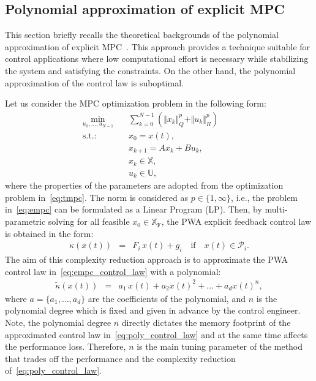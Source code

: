 \documentclass[letterpaper, 10 pt, conference]{ieeeconf}
\newcommand{\polydegree}{n}
\begin{document}
	\subsection{Polynomial approximation of explicit MPC}
	\label{sec:polynomial}
	This section briefly recalls the theoretical backgrounds of the polynomial approximation of explicit MPC~\cite{kvasnica_polynomial}. This approach provides a technique suitable for control applications where low computational effort is necessary while stabilizing the system and satisfying the constraints. On the other hand, the polynomial approximation of the control law is suboptimal. 
	
	Let us consider the MPC optimization problem in the following form:
	\begin{subequations}
		\label{eq:empc}
		\begin{eqnarray}
			\label{eq:empc_cost}
			\min_{u_{0},\ldots,u_{N-1}} \!\!\!\!\!\!\!\!\!\!\! &\,& \sum_{k=0}^{N-1} \left( \Vert x_{k} \Vert_{Q}^{p} + \Vert u_{k} \Vert_{R}^{p} \right) \qquad \\
			\label{eq:empc_rpi}
			\mathrm{s.t.\!:} &\,& x_0 = x(t), \\
			\label{eq:empc_model}
			&\,&  x_{k+1} = A x_{k} + B u_{k} , \\
			\label{eq:empc_constraints_state}
			&\,& x_{k} \in \mathbb{X} , \\
			\label{eq:empc_constraints_input}
			&\,& u_{k} \in \mathbb{U},
		\end{eqnarray}
	\end{subequations}
	where the properties of the parameters are adopted from the optimization problem in~\eqref{eq:tmpc}. The norm is considered as $p \in \{1,\infty \}$, i.e., the problem in~\eqref{eq:empc} can be formulated as a Linear Program (LP). Then, by multi-parametric solving for all feasible $x_0 \in \mathbb{X}_{\mathrm{F}}$, the PWA explicit feedback control law is obtained in the form:
	\begin{eqnarray}
		\label{eq:empc_control_law}
		\kappa(x(t)) \!\!\!\!&=&\!\!\!\! F_{i} \, x(t) + g_{i} \quad \text{if} \quad x(t) \in \mathcal{P}_{i}.
	\end{eqnarray}
	The aim of this complexity reduction approach is to approximate the PWA control law in~\eqref{eq:empc_control_law} with a polynomial:
	\begin{eqnarray}
		\label{eq:poly_control_law}
		\widetilde{\kappa}(x(t)) \!\!\!\!&=&\!\!\!\! a_{1} \, x(t) + a_{2} x(t)^2 + \dots + a_{d} x(t)^\polydegree,
	\end{eqnarray}
	where $a =\{a_{1}, \dots, a_{d}\}$ are the coefficients of the polynomial, and $\polydegree$ is the polynomial degree which is fixed and given in advance by the control engineer. Note, the polynomial degree $\polydegree$ directly dictates the memory footprint of the approximated control law in~\eqref{eq:poly_control_law} and at the same time affects the performance loss. Therefore, $\polydegree$ is the main tuning parameter of the method that trades off the performance and the complexity reduction of~\eqref{eq:poly_control_law}.
	
\end{document}
